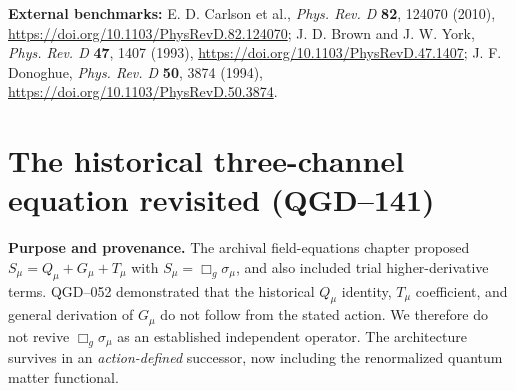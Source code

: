 \documentclass[11pt,a4paper]{article}
\begin{document}
\noindent\textbf{External benchmarks:} E. D. Carlson et al.,
\emph{Phys. Rev. D} \textbf{82}, 124070 (2010),
\url{https://doi.org/10.1103/PhysRevD.82.124070};
J. D. Brown and J. W. York, \emph{Phys. Rev. D} \textbf{47}, 1407 (1993),
\url{https://doi.org/10.1103/PhysRevD.47.1407};
J. F. Donoghue, \emph{Phys. Rev. D} \textbf{50}, 3874 (1994),
\url{https://doi.org/10.1103/PhysRevD.50.3874}.


\section{The historical three-channel equation revisited (QGD--141)}\label{sec:qgd141}
\textbf{Purpose and provenance.} The archival field-equations chapter proposed
$S_\mu=Q_\mu+G_\mu+T_\mu$ with $S_\mu=\Box_g\sigma_\mu$, and also
included trial higher-derivative terms. QGD--052 demonstrated that the
historical $Q_\mu$ identity, $T_\mu$ coefficient, and general derivation
of $G_\mu$ do not follow from the stated action. We therefore do not
revive $\Box_g\sigma_\mu$ as an established independent operator.
The architecture survives in an \emph{action-defined} successor, now
including the renormalized quantum matter functional.
\end{document}
